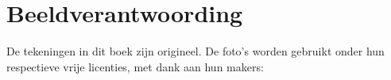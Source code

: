 \chapter*{Beeldverantwoording}

\begingroup\sloppy

De tekeningen in dit boek zijn origineel. De foto's worden gebruikt
onder hun respectieve vrije licenties, met dank aan hun makers:

